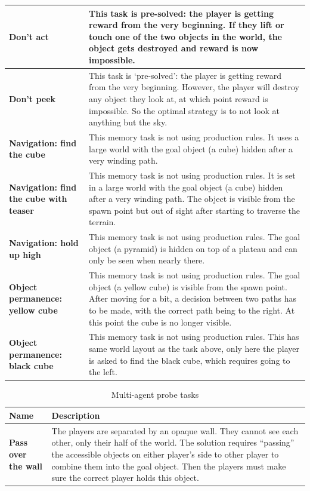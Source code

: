 \documentclass[11pt, a4paper, logo, copyright]{deepmind}
\begin{document}
\begin{appendix}
\begin{longtable}{|>{\raggedright}p{4cm}|p{12cm}|}
\textbf{Don't act} & This task is pre-solved: the player is getting reward from the very beginning. If they lift or touch one of the two objects in the world, the object gets destroyed and reward is now impossible. \\ \hline
\textbf{Don't peek} & This task is `pre-solved': the player is getting reward from the very beginning. However, the player will destroy any object they look at, at which point reward is impossible. So the optimal strategy is to not look at anything but the sky. \\ \hline
\textbf{Navigation: find the cube} & This memory task is not using production rules. It uses a large world with the goal object (a cube) hidden after a very winding path. \\ \hline
\textbf{Navigation: find the cube with teaser} & This memory task is not using production rules. It is set in a large world with the goal object (a cube) hidden after a very winding path. The object is visible from the spawn point but out of sight after starting to traverse the terrain. \\ \hline
\textbf{Navigation: hold up high} & This memory task is not using production rules. The goal object (a pyramid) is hidden on top of a plateau and can only be seen when nearly there. \\ \hline
\textbf{Object permanence: yellow cube} & This memory task is not using production rules. The goal object (a yellow cube) is visible from the spawn point. After moving for a bit, a decision between two paths has to be made, with the correct path being to the right. At this point the cube is no longer visible. \\ \hline
\textbf{Object permanence: black cube} & This memory task is not using production rules. This has same world layout as the task above, only here the player is asked to find the black cube, which requires going to the left. \\
\hline
\end{longtable}
\renewcommand*{\arraystretch}{1.4}
\begin{longtable}{|>{\raggedright}p{4cm}|p{12cm}|}
\caption{Multi-agent probe tasks}
    \label{probe-task-desc-multi-agent}
    \\ \hline
\textbf{Name} & \textbf{Description} \\ \hline
\textbf{Pass over the wall} & The players are separated by an opaque wall. They cannot see each other, only their half of the world. The solution requires ``passing'' the accessible objects on either player's side to other player to combine them into the goal object. Then the players must make sure the correct player holds this object. \\ \hline

\end{longtable}
\end{appendix}
\end{document}
